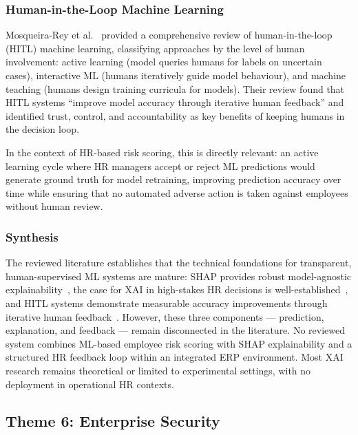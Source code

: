 \documentclass[12pt,a4paper]{article}
\begin{document}
\subsubsection{Human-in-the-Loop Machine Learning}

Mosqueira-Rey et al.~\cite{mosqueira2023hitl} provided a comprehensive review of human-in-the-loop (HITL) machine learning, classifying approaches by the level of human involvement: active learning (model queries humans for labels on uncertain cases), interactive ML (humans iteratively guide model behaviour), and machine teaching (humans design training curricula for models). Their review found that HITL systems ``improve model accuracy through iterative human feedback'' and identified trust, control, and accountability as key benefits of keeping humans in the decision loop.

In the context of HR-based risk scoring, this is directly relevant: an active learning cycle where HR managers accept or reject ML predictions would generate ground truth for model retraining, improving prediction accuracy over time while ensuring that no automated adverse action is taken against employees without human review.

\subsubsection{Synthesis}

The reviewed literature establishes that the technical foundations for transparent, human-supervised ML systems are mature: SHAP provides robust model-agnostic explainability~\cite{lundberg2017shap}, the case for XAI in high-stakes HR decisions is well-established~\cite{adadi2018xai}, and HITL systems demonstrate measurable accuracy improvements through iterative human feedback~\cite{mosqueira2023hitl}. However, these three components --- prediction, explanation, and feedback --- remain disconnected in the literature. No reviewed system combines ML-based employee risk scoring with SHAP explainability and a structured HR feedback loop within an integrated ERP environment. Most XAI research remains theoretical or limited to experimental settings, with no deployment in operational HR contexts.

\subsection{Theme 6: Enterprise Security}
\label{sec:theme6}
\end{document}
